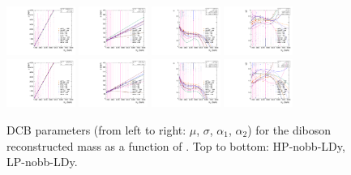 \begin{figure}[htbp]
  \centering
  \includegraphics[width=0.2\textwidth]{fig/2Dfit/paramSignalShape_allSig_MVV_HP_nobb_LDy_MEAN.pdf}
  \includegraphics[width=0.2\textwidth]{fig/2Dfit/paramSignalShape_allSig_MVV_HP_nobb_LDy_SIGMA.pdf}
  \includegraphics[width=0.2\textwidth]{fig/2Dfit/paramSignalShape_allSig_MVV_HP_nobb_LDy_ALPHA1.pdf}
  \includegraphics[width=0.2\textwidth]{fig/2Dfit/paramSignalShape_allSig_MVV_HP_nobb_LDy_ALPHA2.pdf}\\
  \includegraphics[width=0.2\textwidth]{fig/2Dfit/paramSignalShape_allSig_MVV_LP_nobb_LDy_MEAN.pdf}
  \includegraphics[width=0.2\textwidth]{fig/2Dfit/paramSignalShape_allSig_MVV_LP_nobb_LDy_SIGMA.pdf}
  \includegraphics[width=0.2\textwidth]{fig/2Dfit/paramSignalShape_allSig_MVV_LP_nobb_LDy_ALPHA1.pdf}
  \includegraphics[width=0.2\textwidth]{fig/2Dfit/paramSignalShape_allSig_MVV_LP_nobb_LDy_ALPHA2.pdf}\\
  \caption{
    DCB parameters (from left to right: $\mu$, $\sigma$, $\alpha_1$, $\alpha_2$) for the diboson reconstructed mass \MVV as a function of \MX.
    Top to bottom: HP-nobb-LDy, LP-nobb-LDy.
  }
  \label{fig:MVVShapeParam_LDy_Run2}
\end{figure}

